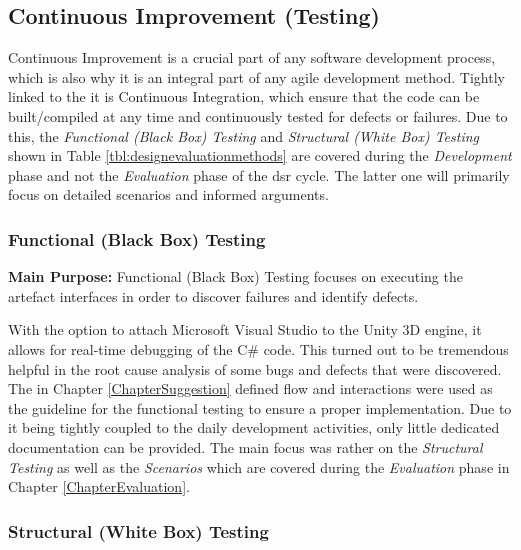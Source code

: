 \subsection{Continuous Improvement (Testing)}

Continuous Improvement is a crucial part of any software development process, which is also why it is an integral part of any agile development method. Tightly linked to the it is Continuous Integration, which ensure that the code can be built/compiled at any time and continuously tested for defects or failures. Due to this, the \textit{Functional (Black Box) Testing} and \textit{Structural (White Box) Testing} shown in Table \ref{tbl:designevaluationmethods} are covered during the \textit{Development} phase and not the \textit{Evaluation} phase of the \gls{dsr} cycle. The latter one will primarily focus on detailed scenarios and informed arguments.


\subsubsection{Functional (Black Box) Testing}

\textbf{Main Purpose:} Functional (Black Box) Testing focuses on executing the artefact interfaces in order to discover failures and identify defects.

With the option to attach Microsoft Visual Studio to the Unity 3D engine, it allows for real-time debugging of the C\# code. This turned out to be tremendous helpful in the root cause analysis of some bugs and defects that were discovered. The in Chapter \ref{ChapterSuggestion} defined flow and interactions were used as the guideline for the functional testing to ensure a proper implementation. Due to it being tightly coupled to the daily development activities, only little dedicated documentation can be provided. The main focus was rather on the \textit{Structural Testing} as well as the \textit{Scenarios} which are covered during the \textit{Evaluation} phase in Chapter \ref{ChapterEvaluation}.


\subsubsection{Structural (White Box) Testing}

